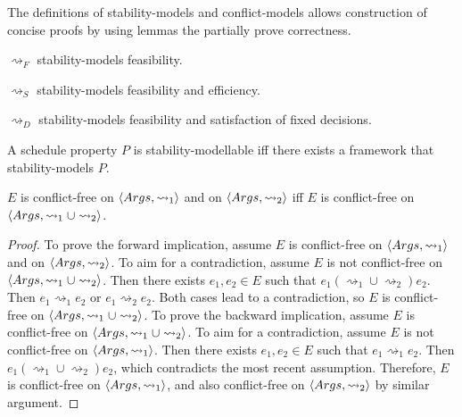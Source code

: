 The definitions of stability-models and conflict-models allows construction of concise proofs by using lemmas the partially prove correctness.

\begin{proposition}
	$\rightsquigarrow_F$ stability-models feasibility.
\end{proposition}

\begin{proposition}
	$\rightsquigarrow_S$ stability-models feasibility and efficiency.
\end{proposition}

\begin{proposition}
	$\rightsquigarrow_D$ stability-models feasibility and satisfaction of fixed decisions.
\end{proposition}

\begin{definition}
	A schedule property $P$ is stability-modellable iff there exists a framework that stability-models $P$.
\end{definition}

\begin{lemma}
	\label{buildconflictfreeness}
	$E$ is conflict-free on $\langle{Args},{\rightsquigarrow_1}\rangle$ and on $\langle{Args},{\rightsquigarrow_2}\rangle$ iff $E$ is conflict-free on $\langle{Args},{\rightsquigarrow_1\cup\rightsquigarrow_2}\rangle$.	

	\begin{proof}
		To prove the forward implication, assume $E$ is conflict-free on $\langle{Args},{\rightsquigarrow_1}\rangle$ and on $\langle{Args},{\rightsquigarrow_2}\rangle$. To aim for a contradiction, assume $E$ is not conflict-free on $\langle{Args},{\rightsquigarrow_1\cup\rightsquigarrow_2}\rangle$. Then there exists $e_1,e_2\in E$ such that $e_1(\rightsquigarrow_1\cup\rightsquigarrow_2)e_2$. Then $e_1\rightsquigarrow_1 e_2$ or $e_1\rightsquigarrow_2 e_2$. Both cases lead to a contradiction, so $E$ is conflict-free on $\langle{Args},{\rightsquigarrow_1\cup\rightsquigarrow_2}\rangle$.
		\linespace
		To prove the backward implication, assume $E$ is conflict-free on $\langle{Args},{\rightsquigarrow_1\cup\rightsquigarrow_2}\rangle$. To aim for a contradiction, assume $E$ is not conflict-free on $\langle{Args},{\rightsquigarrow_1}\rangle$. Then there exists $e_1,e_2\in E$ such that $e_1\rightsquigarrow_1 e_2$. Then $e_1(\rightsquigarrow_1\cup\rightsquigarrow_2)e_2$, which contradicts the most recent assumption. Therefore, $E$ is conflict-free on $\langle{Args},{\rightsquigarrow_1}\rangle$, and also conflict-free on $\langle{Args},{\rightsquigarrow_2}\rangle$ by similar argument.
	\end{proof}
\end{lemma}

